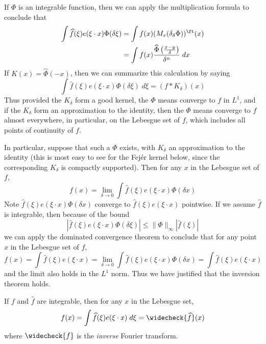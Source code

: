 If $\Phi$ is an integrable function, then we can apply the multiplication formula to conclude that
%
\begin{align*}
	\int \widehat{f}(\xi) e(\xi \cdot x) \Phi(\delta \xi) &= \int f(x) (M_x (\delta_\delta \Phi))^\ft(x)\\
	&= \int f(x) \frac{\widehat{\Phi} \left( \frac{x - y}{\delta} \right) }{\delta^n}\; dx
\end{align*}
%
If $K(x) = \widehat{\Phi}(-x)$, then we can summarize this calculation by saying
%
\[ \int \widehat{f}(\xi) e(\xi \cdot x) \Phi(\delta \xi)\; d\xi = (f * K_\delta)(x) \]
%
Thus provided the $K_\delta$ form a good kernel, the $\Phi$ means converge to $f$ in $L^1$, and if the $K_\delta$ form an approximation to the identity, then the $\Phi$ means converge to $f$ almost everywhere, in particular, on the Lebesgue set of $f$, which includes all points of continuity of $f$.

In particular, suppose that such a $\Phi$ exists, with $K_\delta$ an approximation to the identity (this is most easy to see for the Fej\'{e}r kernel below, since the corresponding $K_\delta$ is compactly supported). Then for any $x$ in the Lebesgue set of $f$,
%
\[ f(x) = \lim_{\delta \to 0} \int \widehat{f}(\xi) e(\xi \cdot x) \Phi(\delta x) \]
%
Note $\widehat{f}(\xi) e(\xi \cdot x) \Phi(\delta x)$ converge to $\widehat{f}(\xi) e(\xi \cdot x)$ pointwise. If we assume $\widehat{f}$ is integrable, then because of the bound
%
\[ \left| \widehat{f}(\xi) e(\xi \cdot x) \Phi(\delta \xi) \right| \leq \| \Phi \|_\infty | \widehat{f}(\xi) | \]
%
we can apply the dominated convergence theorem to conclude that for any point $x$ in the Lebesgue set of $f$,
%
\[ f(x) = \int \widehat{f}(\xi) e(\xi \cdot x) = \lim_{\delta \to 0} \int \widehat{f}(\xi) e(\xi \cdot x) \Phi(\delta x) = \int \widehat{f}(\xi) e(\xi \cdot x) \]
%
and the limit also holds in the $L^1$ norm. Thus we have justified that the inversion theorem holds.

\begin{theorem}
	If $f$ and $\widehat{f}$ are integrable, then for any $x$ in the Lebesgue set,
	\[ f(x) = \int \widehat{f}(\xi) e(\xi \cdot x)\; d\xi = \widecheck{\widehat{f}}(x) \]
	where $\widecheck{f}$ is the {\it inverse} Fourier transform.
\end{theorem}

